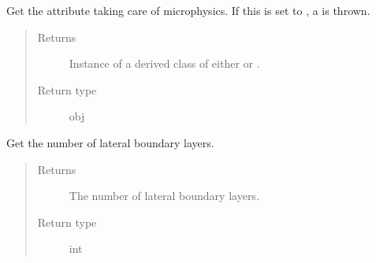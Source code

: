\documentclass[letterpaper,10pt,english]{sphinxmanual}
\begin{document}
\begin{fulllineitems}

\begin{fulllineitems}
\label{\detokenize{api:tasmania.dycore.prognostic_isentropic_nonconservative.PrognosticIsentropicNonconservative.microphysics}}
Get the attribute taking care of microphysics.
If this is set to , a  is thrown.
\begin{quote}\begin{description}
\item[{Returns}] \leavevmode
Instance of a derived class of either 
or {\hyperref[\detokenize{api:tasmania.parameterizations.adjustments.AdjustmentMicrophysics}]{}}.

\item[{Return type}] \leavevmode
obj

\end{description}\end{quote}

\end{fulllineitems}


\begin{fulllineitems}
\label{\detokenize{api:tasmania.dycore.prognostic_isentropic_nonconservative.PrognosticIsentropicNonconservative.nb}}
Get the number of lateral boundary layers.
\begin{quote}\begin{description}
\item[{Returns}] \leavevmode
The number of lateral boundary layers.

\item[{Return type}] \leavevmode
int

\end{description}\end{quote}

\end{fulllineitems}



\end{fulllineitems}
\end{document}
